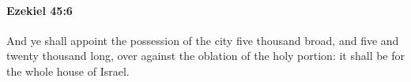 
		\paragraph{Ezekiel 45:6} %
			\label{EZEKIEL-45-6}

			And ye shall appoint the possession of the city five thousand broad, and five and twenty thousand long, over against the oblation of the holy portion: it shall be for the whole house of Israel.


